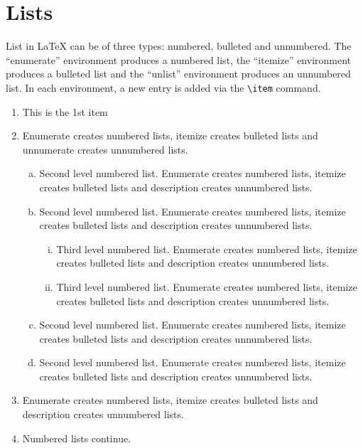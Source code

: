 \documentclass[unnumsec,webpdf,contemporary,large]{oup-authoring-template}%
\theoremstyle{thmstyleone}%
\theoremstyle{thmstyletwo}%
\theoremstyle{thmstylethree}%
\begin{document}
\section{Lists}\label{sec9}

List in \LaTeX{} can be of three types: numbered, bulleted and unnumbered. The ``enumerate'' environment produces a numbered list, the
``itemize'' environment produces a bulleted list and the ``unlist''
environment produces an unnumbered list.
In each environment, a new entry is added via the \verb+\item+ command.
\begin{enumerate}[1.]
	\item This is the 1st item

	\item Enumerate creates numbered lists, itemize creates bulleted lists and
	      unnumerate creates unnumbered lists.
	      \begin{enumerate}[(a)]
		      \item Second level numbered list. Enumerate creates numbered lists, itemize creates bulleted lists and
		            description creates unnumbered lists.

		      \item Second level numbered list. Enumerate creates numbered lists, itemize creates bulleted lists and
		            description creates unnumbered lists.
		            \begin{enumerate}[(ii)]
			            \item Third level numbered list. Enumerate creates numbered lists, itemize creates bulleted lists and
			                  description creates unnumbered lists.

			            \item Third level numbered list. Enumerate creates numbered lists, itemize creates bulleted lists and
			                  description creates unnumbered lists.
		            \end{enumerate}

		      \item Second level numbered list. Enumerate creates numbered lists, itemize creates bulleted lists and
		            description creates unnumbered lists.

		      \item Second level numbered list. Enumerate creates numbered lists, itemize creates bulleted lists and
		            description creates unnumbered lists.
	      \end{enumerate}

	\item Enumerate creates numbered lists, itemize creates bulleted lists and
	      description creates unnumbered lists.

	\item Numbered lists continue.
\end{enumerate}
\end{document}
